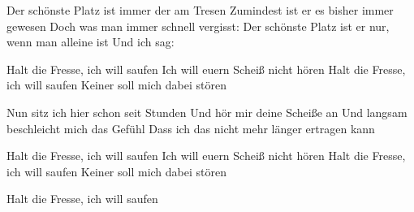 \medskip

\begin{guitar}
  Der schönste Platz ist immer der am Tresen
  Zumindest ist er es bisher immer gewesen
  Doch was man immer schnell vergisst:
  Der schönste Platz ist er nur, wenn man alleine ist
  Und ich sag:

  \smallskip
  Halt die Fresse, ich will saufen
  Ich will euern Scheiß nicht hören
  Halt die Fresse, ich will saufen
  Keiner soll mich dabei stören
  \smallskip

  Nun sitz ich hier schon seit Stunden
  Und hör mir deine Scheiße an
  Und langsam beschleicht mich das Gefühl
  Dass ich das nicht mehr länger ertragen kann

  Halt die Fresse, ich will saufen
  Ich will euern Scheiß nicht hören
  Halt die Fresse, ich will saufen
  Keiner soll mich dabei stören

  Halt die Fresse, ich will saufen
\end{guitar}
